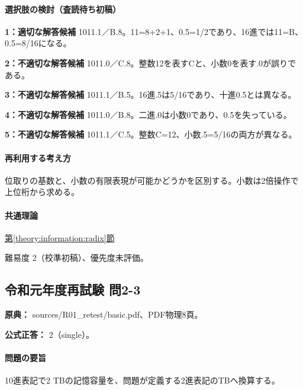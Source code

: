 \paragraph{選択肢の検討（査読待ち初稿）}\mbox{}\par

\noindent\textbf{1：適切な解答候補} 1011.1／B.8。11=\allowbreak{}8+2+1、0.5=\allowbreak{}1/2であり、16進では11=\allowbreak{}B、0.5=\allowbreak{}8/16になる。\par

\noindent\textbf{2：不適切な解答候補} 1011.0／C.8。整数12を表すCと、小数0を表す.0が誤りである。\par

\noindent\textbf{3：不適切な解答候補} 1011.1／B.5。16進.5は5/16であり、十進0.5とは異なる。\par

\noindent\textbf{4：不適切な解答候補} 1011.0／B.8。二進.0は小数0であり、0.5を失っている。\par

\noindent\textbf{5：不適切な解答候補} 1011.1／C.5。整数C=\allowbreak{}12、小数.5=\allowbreak{}5/16の両方が異なる。\par

\paragraph{再利用する考え方} 位取りの基数と、小数の有限表現が可能かどうかを区別する。小数は2倍操作で上位桁から求める。

\paragraph{共通理論} \hyperref[theory:information:radix]{第\ref*{theory:information:radix}節}

\par 難易度 2（校準初稿）、優先度未評価。

\subsection{令和元年度再試験 問2-3}
\label{q:r01-ret-basic-2-3}

\noindent\textbf{原典：} sources/R01\_retest/basic.pdf、PDF物理8頁。

\textbf{公式正答：} 2（single）。

\paragraph{問題の要旨} 10進表記で2 TBの記憶容量を、問題が定義する2進表記のTBへ換算する。

